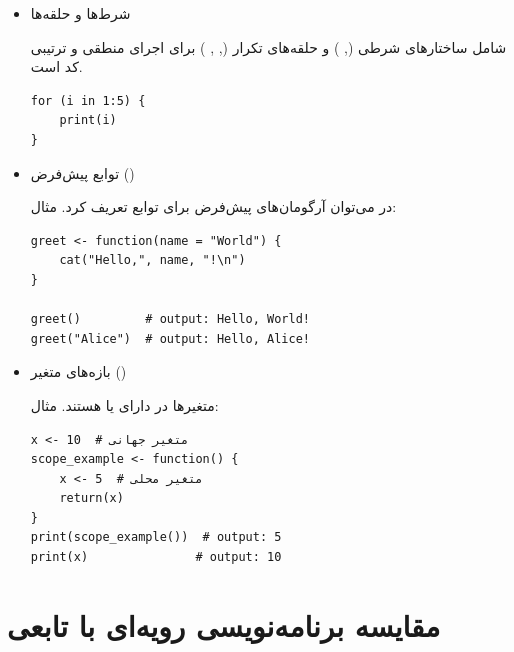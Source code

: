 \documentclass[11pt, a4paper, oneside]{book}
\begin{document}
			\begin{itemize}
				
				\item {\large شرط‌ها و حلقه‌ها} \par
				
				شامل ساختارهای شرطی (, ) و حلقه‌های تکرار (, , ) برای اجرای منطقی و ترتیبی کد است.
				
				 \begin{latin}
					\begin{lstlisting}[caption={\lr{for}}] 
for (i in 1:5) {
	print(i)
}

					\end{lstlisting}
				\end{latin}
				
				\item {\large توابع پیش‌فرض ()} \par
				در  می‌توان آرگومان‌های پیش‌فرض برای توابع تعریف کرد.
				مثال:
				
				\begin{latin}
					\begin{lstlisting}[caption={\lr{Default Arguments}}] 
greet <- function(name = "World") {
	cat("Hello,", name, "!\n")
}

greet()         # output: Hello, World!
greet("Alice")  # output: Hello, Alice!

					\end{lstlisting}
				\end{latin}
				
				
				\item {\large بازه‌های متغیر ()} \par
				
				متغیرها در  دارای  یا  هستند.
				مثال:
				
				\begin{latin}
					\begin{lstlisting}[caption={\lr{Variable Scope}}] 
x <- 10  # متغیر جهانی
scope_example <- function() {
	x <- 5  # متغیر محلی
	return(x)
}
print(scope_example())  # output: 5
print(x)               # output: 10

					\end{lstlisting}
				\end{latin}
				
			\end{itemize}
		
		\section{مقایسه برنامه‌نویسی رویه‌ای با تابعی}
		
\end{document}
